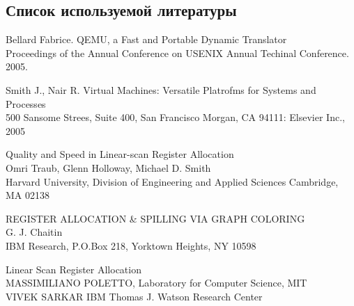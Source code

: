 \subsection{ Список используемой литературы}
\begin{my_enumerate}
\item
Bellard Fabrice. QEMU, a Fast and Portable Dynamic Translator \\
Proceedings of the Annual Conference on USENIX Annual Techinal Conference. 2005. \\

\item
Smith J., Nair R. Virtual Machines: Versatile Platrofms for Systems and Processes \\
500 Sansome Strees, Suite 400, San Francisco Morgan, CA 94111: Elsevier Inc., 2005 \\

\item Quality and Speed in Linear-scan Register Allocation \\
Omri Traub, Glenn Holloway, Michael D. Smith \\
Harvard University, Division of Engineering and Applied Sciences Cambridge, MA 02138 \\

\item REGISTER ALLOCATION \& SPILLING VIA GRAPH COLORING \\
G. J. Chaitin \\
IBM Research, P.O.Box 218, Yorktown Heights, NY 10598 \\

\item Linear Scan Register Allocation \\
MASSIMILIANO POLETTO, Laboratory for Computer Science, MIT \\
VIVEK SARKAR IBM Thomas J. Watson Research Center \\


\end{my_enumerate}

